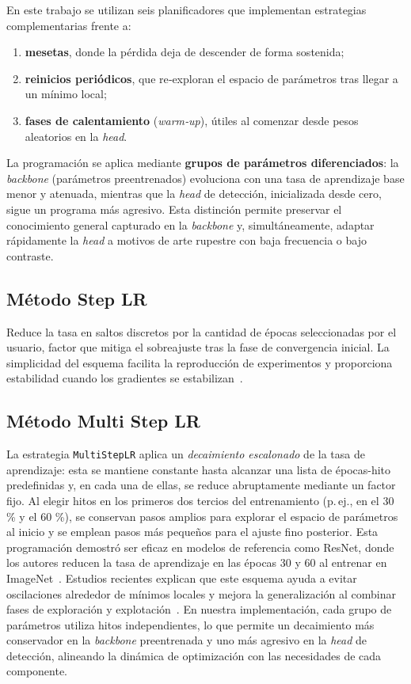 En este trabajo se utilizan seis planificadores que implementan estrategias complementarias frente a:
\renewcommand\labelenumi{(\alph{enumi})}
\begin{enumerate}
    \item \textbf{mesetas}, donde la pérdida deja de descender de forma sostenida;
    \item \textbf{reinicios periódicos}, que re‐exploran el espacio de parámetros tras llegar a un mínimo local;
    \item \textbf{fases de calentamiento} (\emph{warm‐up}), útiles al comenzar desde pesos aleatorios en la \emph{head}.
\end{enumerate}

La programación se aplica mediante \textbf{grupos de parámetros diferenciados}: la \emph{backbone} (parámetros preentrenados) evoluciona con una tasa de aprendizaje base menor y atenuada, mientras que la \emph{head} de detección, inicializada desde cero, sigue un programa más agresivo.
Esta distinción permite preservar el conocimiento general capturado en la \emph{backbone} y, simultáneamente, adaptar rápidamente la \emph{head} a motivos de arte rupestre con baja frecuencia o bajo contraste.

\subsection*{Método Step LR}
Reduce la tasa en saltos discretos por la cantidad de épocas seleccionadas por el usuario, factor que mitiga el sobreajuste tras la fase de convergencia inicial.
La simplicidad del esquema facilita la reproducción de experimentos y proporciona estabilidad cuando los gradientes se estabilizan~\cite{goyal2017}.

\subsection*{Método Multi Step LR}
La estrategia \texttt{MultiStepLR} aplica un \emph{decaimiento escalonado} de la tasa de aprendizaje: esta se mantiene constante hasta alcanzar una lista de épocas-hito predefinidas y, en cada una de ellas, se reduce abruptamente mediante un factor fijo.
Al elegir hitos en los primeros dos tercios del entrenamiento (p.\,ej., en el 30 \% y el 60 \%), se conservan pasos amplios para explorar el espacio de parámetros al inicio y se emplean pasos más pequeños para el ajuste fino posterior.
Esta programación demostró ser eficaz en modelos de referencia como ResNet, donde los autores reducen la tasa de aprendizaje en las épocas 30 y 60 al entrenar en ImageNet~\cite{he2016deep}.
Estudios recientes explican que este esquema ayuda a evitar oscilaciones alrededor de mínimos locales y mejora la generalización al combinar fases de exploración y explotación~\cite{you2019lrdecay}.
En nuestra implementación, cada grupo de parámetros utiliza hitos independientes, lo que permite un decaimiento más conservador en la \emph{backbone} preentrenada y uno más agresivo en la \emph{head} de detección, alineando la dinámica de optimización con las necesidades de cada componente.

